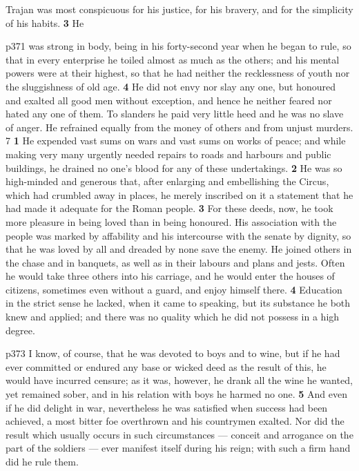 Trajan was most conspicuous for his justice, for his bravery, and for the simplicity of his habits. \textbf{3} He

p371 was strong in body, being in his forty-second year when he began to rule, so that in every enterprise he toiled almost as much as the others; and his mental powers were at their highest, so that he had neither the recklessness of youth nor the sluggishness of old age. \textbf{4} He did not envy nor slay any one, but honoured and exalted all good men without exception, and hence he neither feared nor hated any one of them. To slanders he paid very little heed and he was no slave of anger. He refrained equally from the money of others and from unjust murders. 7 \textbf{1} He expended vast sums on wars and vast sums on works of peace; and while making very many urgently needed repairs to roads and harbours and public buildings, he drained no one's blood for any of these undertakings. \textbf{2} He was so high-minded and generous that, after enlarging and embellishing the Circus, which had crumbled away in places, he merely inscribed on it a statement that he had made it adequate for the Roman people. \textbf{3} For these deeds, now, he took more pleasure in being loved than in being honoured. His association with the people was marked by affability and his intercourse with the senate by dignity, so that he was loved by all and dreaded by none save the enemy. He joined others in the chase and in banquets, as well as in their labours and plans and jests. Often he would take three others into his carriage, and he would enter the houses of citizens, sometimes even without a guard, and enjoy himself there. \textbf{4} Education in the strict sense he lacked, when it came to speaking, but its substance he both knew and applied; and there was no quality which he did not possess in a high degree.

p373 I know, of course, that he was devoted to boys and to wine, but if he had ever committed or endured any base or wicked deed as the result of this, he would have incurred censure; as it was, however, he drank all the wine he wanted, yet remained sober, and in his relation with boys he harmed no one. \textbf{5} And even if he did delight in war, nevertheless he was satisfied when success had been achieved, a most bitter foe overthrown and his countrymen exalted. Nor did the result which usually occurs in such circumstances \texthebrew{—} conceit and arrogance on the part of the soldiers \texthebrew{—} ever manifest itself during his reign; with such a firm hand did he rule them.

